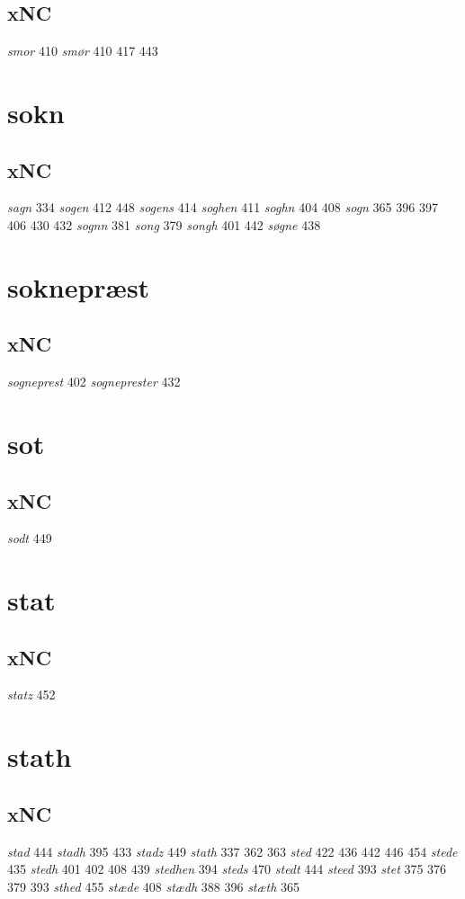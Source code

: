 \documentclass[a4paper,twocolumn]{article}
\begin{document}
\subsection{xNC}
\label{sec:org3cce31d}
\emph{smor} 410 \emph{smør} 410 417 443 
\section{sokn}
\label{sec:org6435959}
\subsection{xNC}
\label{sec:orgca72253}
\emph{sagn} 334 \emph{sogen} 412 448 \emph{sogens} 414 \emph{soghen} 411 \emph{soghn} 404 408 \emph{sogn} 365 396 397 406 430 432 \emph{sognn} 381 \emph{song} 379 \emph{songh} 401 442 \emph{søgne} 438 
\section{soknepræst}
\label{sec:org422b149}
\subsection{xNC}
\label{sec:org1c97d04}
\emph{sogneprest} 402 \emph{sogneprester} 432 
\section{sot}
\label{sec:orgeec4cd2}
\subsection{xNC}
\label{sec:orgaeb500b}
\emph{sodt} 449 
\section{stat}
\label{sec:orgdb137bb}
\subsection{xNC}
\label{sec:orgfcf0fcc}
\emph{statz} 452 
\section{stath}
\label{sec:org00052aa}
\subsection{xNC}
\label{sec:org91c42f0}
\emph{stad} 444 \emph{stadh} 395 433 \emph{stadz} 449 \emph{stath} 337 362 363 \emph{sted} 422 436 442 446 454 \emph{stede} 435 \emph{stedh} 401 402 408 439 \emph{stedhen} 394 \emph{steds} 470 \emph{stedt} 444 \emph{steed} 393 \emph{stet} 375 376 379 393 \emph{sthed} 455 \emph{stæde} 408 \emph{stædh} 388 396 \emph{stæth} 365 
\end{document}
